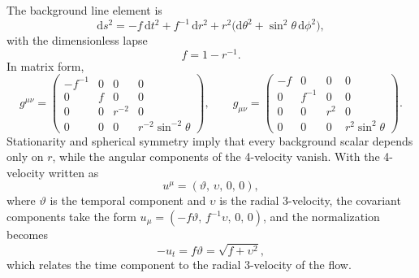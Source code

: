 \documentclass[12pt,a4paper,preprint]{elsarticle}
\begin{document}
            The background line element is
            \begin{equation}
                \mathrm{d}s^{2} = -f\,\mathrm{d}t^{2} + f^{-1}\,\mathrm{d}r^{2} + r^{2}\bigl(\mathrm{d}\theta^{2}+\sin^{2}\theta\,\mathrm{d}\phi^{2}\bigr) ,
                \label{eq:schwarzschild-metric}
            \end{equation}
            with the dimensionless lapse
            \begin{equation}
                f = 1 - r^{-1} .
                \label{eq:lapse-function}
            \end{equation}
            In matrix form,
            \begin{equation}
                g^{\mu\nu} =
                \begin{pmatrix}
                    -f^{-1} & 0 & 0 & 0 \\
                    0 & f & 0 & 0 \\
                    0 & 0 & r^{-2} & 0 \\
                    0 & 0 & 0 & r^{-2}\sin^{-2}\theta
                \end{pmatrix} ,
                \qquad
                g_{\mu\nu} =
                \begin{pmatrix}
                    -f & 0 & 0 & 0 \\
                    0 & f^{-1} & 0 & 0 \\
                    0 & 0 & r^{2} & 0 \\
                    0 & 0 & 0 & r^{2}\sin^{2}\theta
                \end{pmatrix} .
                \label{eq:schwarzschild-metric-matrix}
            \end{equation}
            Stationarity and spherical symmetry imply that every background scalar depends only on $r$, while the angular components of the 4-velocity vanish. With the 4-velocity written as
            \begin{equation}
                u^{\mu} = (\vartheta,\,\upsilon,\,0,\,0) ,
                \label{eq:four-velocity-schwarzschild}
            \end{equation}
            where $\vartheta$ is the temporal component and $\upsilon$ is the radial 3-velocity, the covariant components take the form $u_{\mu}=(-f\vartheta,\,f^{-1}\upsilon,\,0,\,0)$, and the normalization becomes
            \begin{equation}
                -u_{t} = f\vartheta = \sqrt{f+\upsilon^{2}} ,
                \label{eq:four-velocity-norm-schwarzschild}
            \end{equation}
            which relates the time component to the radial 3-velocity of the flow.
\end{document}

